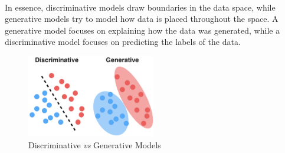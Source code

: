     \paragraph{}
    
    In essence, discriminative models draw boundaries in the data space, while generative models try to model how data is placed throughout the space. A generative model focuses on explaining how the data was generated, while a discriminative model focuses on predicting the labels of the data.
    
    \begin{figure}
        \centering
        \includegraphics[width=0.5\textwidth]{images/descriminative_generative.png}
        \caption{Discriminative \textit{vs} Generative Models}
        \label{descriminative_generative}
    \end{figure}